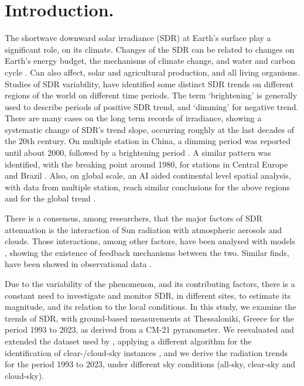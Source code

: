 \documentclass[An awesome
journal,,,moreauthors,pdftex]{Definitions/mdpi}
\begin{document}

\hypertarget{introduction.}{%
\section{Introduction.}\label{introduction.}}

The shortwave downward solar irradiance (SDR) at Earth's surface play a
significant role, on its climate. Changes of the SDR can be related to
changes on Earth's energy budget, the mechanisms of climate change, and
water and carbon cycle \citep{Wild2009}. Can also affect, solar and
agricultural production, and all living organisms. Studies of SDR
variability, have identified some distinct SDR trends on different
regions of the world on different time periods. The term `brightening'
is generally used to describe periods of positive SDR trend, and
`dimming' for negative trend. There are many cases on the long term
records of irradiance, showing a systematic change of SDR's trend slope,
occurring roughly at the last decades of the 20th century. On multiple
station in China, a dimming period was reported until about 2000,
followed by a brightening period \citep{Yang2021}. A similar pattern was
identified, with the breaking point around 1980, for stations in Central
Europe \citep{Wild2021} and Brazil \citep{Yamasoe2021}. Also, on global
scale, an AI aided continental level spatial analysis, with data from
multiple station, reach similar conclusions for the above regions and
for the global trend \citep{Yuan2021}.

There is a consensus, among researchers, that the major factors of SDR
attenuation is the interaction of Sun radiation with atmospheric
aerosols and clouds. Those interactions, among other factors, have been
analysed with models \citep{Li2016, Samset2018}, showing the existence
of feedback mechanisms between the two. Similar finds, have been showed
in observational data \citep[ and references
therein]{Schwarz2020, Ohvril2009, Zerefos2009, Xia2007}.

Due to the variability of the phenomenon, and its contributing factors,
there is a constant need to investigate and monitor SDR, in different
sites, to estimate its magnitude, and its relation to the local
conditions. In this study, we examine the trends of SDR, with
ground-based measurements at Thessaloniki, Greece for the period 1993 to
2023, as derived from a CM-21 pyranometer. We reevaluated and extended
the dataset used by \citet{Bais2013}, applying a different algorithm for
the identification of clear-/cloud-sky instances
\citep{Reno2016, Reno2012a}, and we derive the radiation trends for the
period 1993 to 2023, under different sky conditions (all-sky, clear-sky
and cloud-sky).
\end{document}

